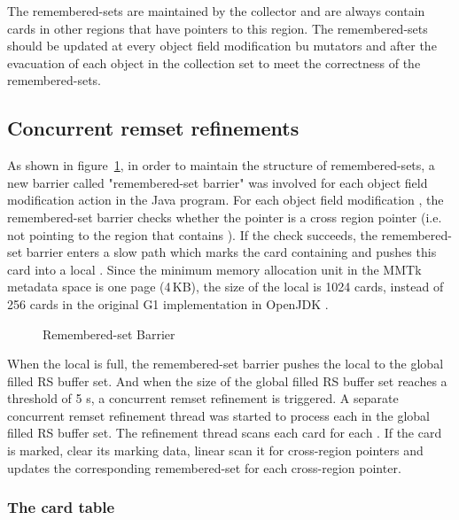 The remembered-sets are maintained by the collector and are always contain cards in other regions that have pointers to this region.
The remembered-sets should be updated at every object field modification bu mutators and after
the evacuation of each object in the collection set to meet the correctness of the remembered-sets.

\subsection{Concurrent remset refinements}

As shown in figure~\ref{fig:remsetbarrier}, in order to maintain the structure of remembered-sets,
a new barrier called "remembered-set barrier" was involved for each object field modification action in the Java program.
For each object field modification , the remembered-set barrier checks
whether the pointer  is a cross region pointer (i.e. not pointing to the region that contains ).
If the check succeeds, the remembered-set barrier enters a slow path which marks the
card containing  and pushes this card into a local .
Since the minimum memory allocation unit in the MMTk metadata space is one page (4\,KB), the size of
the local  is 1024 cards, instead of 256 cards in the original G1 implementation in OpenJDK \cite{detlefs2004garbage}.

\begin{figure}
  \centering
  
  \caption{Remembered-set Barrier}
  \label{fig:remsetbarrier}
\end{figure}

When the local  is full, the remembered-set barrier
pushes the local  to the global filled RS buffer set.
And when the size of the global filled RS buffer set reaches a threshold of 5 s,
a concurrent remset refinement is triggered.
A separate concurrent remset refinement thread was started to process each
 in the global filled RS buffer set.
The refinement thread scans each card for each .
If the card is marked, clear its marking data, linear scan it for cross-region pointers
and updates the corresponding remembered-set for each cross-region pointer.

\subsubsection{The card table}


